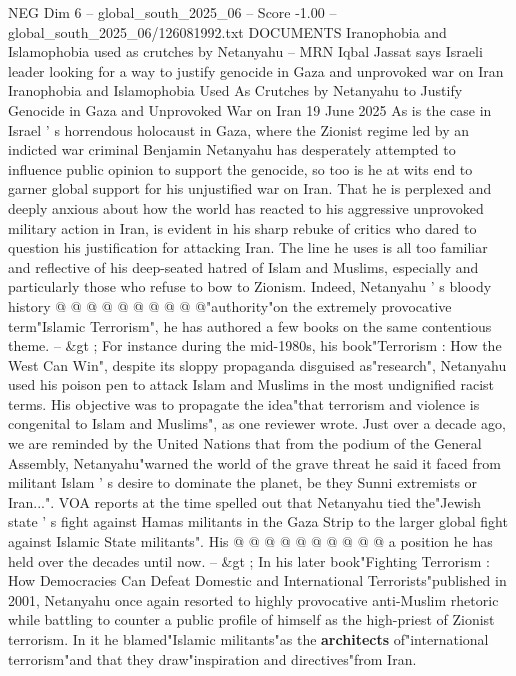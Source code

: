 \begin{textsample}{NEG Dim 6 – global\_south\_2025\_06 – Score -1.00 – global\_south\_2025\_06/126081992.txt}  \label{ex:f6_neg_427}
DOCUMENTS Iranophobia and Islamophobia used as crutches by Netanyahu -- MRN Iqbal Jassat says Israeli leader looking for a way to justify genocide in Gaza and unprovoked war on Iran Iranophobia and Islamophobia Used As Crutches by Netanyahu to Justify Genocide in Gaza and Unprovoked War on Iran 19 June 2025 As is the case in Israel ' s horrendous holocaust in Gaza, where the Zionist regime led by an indicted war criminal Benjamin Netanyahu has desperately attempted to influence public opinion to support the genocide, so too is he at wits end to garner global support for his unjustified war on Iran.
That he is perplexed and deeply anxious about how the world has reacted to his aggressive unprovoked military action in Iran, is evident in his sharp rebuke of critics who dared to question his justification for attacking Iran.
The line he uses is all too familiar and reflective of his deep-seated hatred of Islam and Muslims, especially and particularly those who refuse to bow to Zionism.
Indeed, Netanyahu ' s bloody history @ @ @ @ @ @ @ @ @ @"authority"on the extremely provocative term"Islamic Terrorism", he has authored a few books on the same contentious theme. -- \&gt ; For instance during the mid-1980s, his book"Terrorism : How the West Can Win", despite its sloppy propaganda disguised as"research", Netanyahu used his poison pen to attack Islam and Muslims in the most undignified racist terms.
His objective was to propagate the idea"that terrorism and violence is congenital to Islam and Muslims", as one reviewer wrote.
Just over a decade ago, we are reminded by the United Nations that from the podium of the General Assembly, Netanyahu"warned the world of the grave threat he said it faced from militant Islam ' s desire to dominate the planet, be they Sunni extremists or Iran...".
VOA reports at the time spelled out that Netanyahu tied the"Jewish state ' s fight against Hamas militants in the Gaza Strip to the larger global fight against Islamic State militants".
His @ @ @ @ @ @ @ @ @ @ a position he has held over the decades until now. -- \&gt ; In his later book"Fighting Terrorism : How Democracies Can Defeat Domestic and International Terrorists"published in 2001, Netanyahu once again resorted to highly provocative anti-Muslim rhetoric while battling to counter a public profile of himself as the high-priest of Zionist terrorism.
In it he blamed"Islamic militants"as the \textbf{architects} of"international terrorism"and that they draw"inspiration and directives"from Iran.

\end{textsample}
